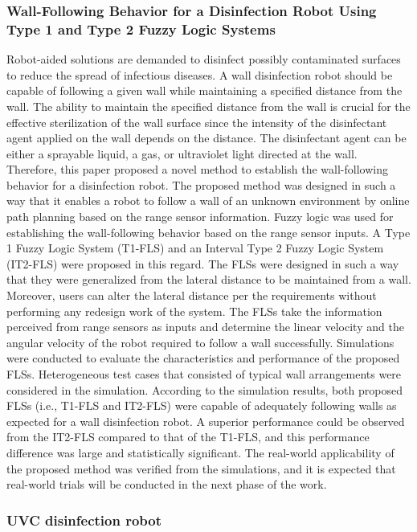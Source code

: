 \documentclass[letterpaper]{article} %
\begin{document}
\subsubsection{Wall-Following Behavior for a Disinfection Robot Using Type 1 and Type 2 Fuzzy Logic Systems}
\cite{Muthugaletal2020} 
Robot-aided solutions are demanded to disinfect possibly contaminated surfaces to reduce the spread of infectious diseases. A wall disinfection robot should be capable of following a given wall while maintaining a specified distance from the wall. The ability to maintain the specified distance from the wall is crucial for the effective sterilization of the wall surface since the intensity of the disinfectant agent applied on the wall depends on the distance. The disinfectant agent can be either a sprayable liquid, a gas, or ultraviolet light directed at the wall. Therefore, this paper proposed a novel method to establish the wall-following behavior for a disinfection robot.
The proposed method was designed in such a way that it enables a robot to follow a wall of an unknown environment by online path planning based on the range sensor information. Fuzzy logic was used for establishing the wall-following behavior based on the range sensor inputs. A Type 1 Fuzzy Logic System (T1-FLS) and an Interval Type 2 Fuzzy Logic System (IT2-FLS) were proposed in this regard. The FLSs were designed in such a way that they were generalized from the lateral distance to be maintained from a wall. Moreover, users can alter the lateral distance per the requirements without performing any redesign work of the system. The FLSs take the information perceived from range sensors as inputs and determine the linear velocity and the angular velocity of the robot required to follow a wall successfully.
Simulations were conducted to evaluate the characteristics and performance of the proposed FLSs. Heterogeneous test cases that consisted of typical wall arrangements were considered in the simulation. According to the simulation results, both proposed FLSs (i.e., T1-FLS and IT2-FLS) were capable of adequately following walls as expected for a wall disinfection robot. A superior performance could be observed from the IT2-FLS compared to that of the T1-FLS, and this performance difference was large and statistically significant. The real-world applicability of the proposed method was verified from the simulations, and it is expected that real-world trials will be conducted in the next phase of the work.

\subsubsection{UVC disinfection robot}
\end{document}
